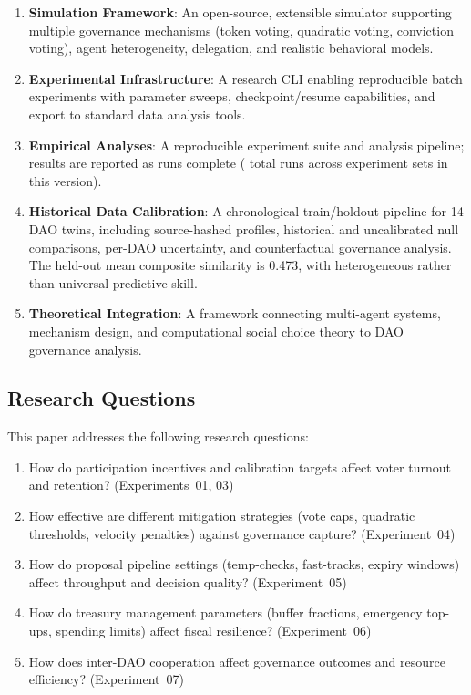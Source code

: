 \begin{enumerate}
    \item \textbf{Simulation Framework}: An open-source, extensible simulator supporting multiple governance mechanisms (token voting, quadratic voting, conviction voting), agent heterogeneity, delegation, and realistic behavioral models.

    \item \textbf{Experimental Infrastructure}: A research CLI enabling reproducible batch experiments with parameter sweeps, checkpoint/resume capabilities, and export to standard data analysis tools.

    \item \textbf{Empirical Analyses}: A reproducible experiment suite and analysis pipeline; results are reported as runs complete (\totalruns{} total runs across \experimentcount{} experiment sets in this version).

    \item \textbf{Historical Data Calibration}: A chronological train/holdout pipeline for 14 DAO twins, including source-hashed profiles, historical and uncalibrated null comparisons, per-DAO uncertainty, and counterfactual governance analysis. The held-out mean composite similarity is 0.473, with heterogeneous rather than universal predictive skill.

    \item \textbf{Theoretical Integration}: A framework connecting multi-agent systems, mechanism design, and computational social choice theory to DAO governance analysis.
\end{enumerate}

\subsection{Research Questions}

This paper addresses the following research questions:

\begin{enumerate}[label=\textbf{RQ\arabic*}:]
    \item How do participation incentives and calibration targets affect voter turnout and retention? (Experiments~01, 03)
    \item How effective are different mitigation strategies (vote caps, quadratic thresholds, velocity penalties) against governance capture? (Experiment~04)
    \item How do proposal pipeline settings (temp-checks, fast-tracks, expiry windows) affect throughput and decision quality? (Experiment~05)
    \item How do treasury management parameters (buffer fractions, emergency top-ups, spending limits) affect fiscal resilience? (Experiment~06)
    \item How does inter-DAO cooperation affect governance outcomes and resource efficiency? (Experiment~07)
\end{enumerate}

